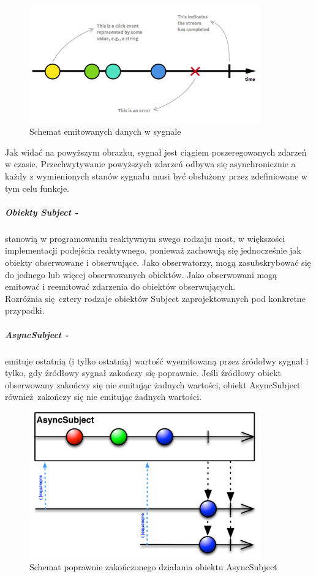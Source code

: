 \documentclass[12pt,oneside,a4paper]{report}
\begin{document}
\begin{figure}[ht!]
\centering
\includegraphics[width=10cm]{sygnalRx}
\caption{Schemat emitowanych danych w sygnale}
\label{sygnalRx}
\end{figure}

Jak widać na powyższym obrazku, sygnał jest ciągiem poszeregowanych zdarzeń w czasie. Przechwytywanie powyższych zdarzeń odbywa się asynchronicznie a każdy z wymienionych stanów sygnału musi być obsłużony przez zdefiniowane w tym celu funkcje. \\
\subparagraph{Obiekty Subject -}stanowią w programowaniu reaktywnym swego rodzaju most, w większości implementacji podejścia reaktywnego, ponieważ zachowują się jednocześnie jak obiekty obserwowane i obserwujące. Jako obserwatorzy, mogą zasubskrybować się do jednego lub więcej obserwowanych obiektów. Jako obserwowani mogą emitować i reemitować zdarzenia do obiektów obserwujących.\\
Rozróżnia się cztery rodzaje obiektów Subject zaprojektowanych pod konkretne przypadki.  
\subparagraph{AsyncSubject -}emituje ostatnią (i tylko ostatnią) wartość wyemitowaną przez źródołwy sygnał i tylko, gdy źródłowy sygnał zakończy się poprawnie. Jeśli źródłowy obiekt obserwowany zakończy się nie emitując żadnych wartości, obiekt AsyncSubject również zakończy się nie emitując żadnych wartości.
\begin{figure}[ht!]
	\centering
	\includegraphics[width=10cm]{asyncSubject}
	\caption{Schemat poprawnie zakończonego działania obiektu AsyncSubject}
	\label{asyncSubject}
\end{figure}
\end{document}
